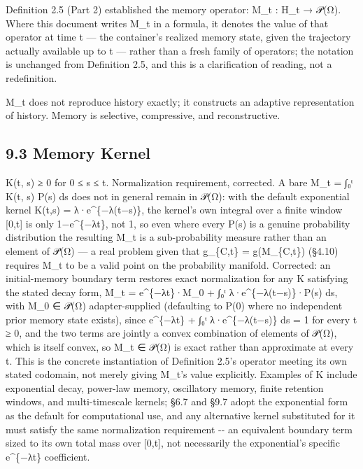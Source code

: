 \documentclass[
]{article}
\begin{document}
Definition 2.5 (Part 2) established the memory operator: M\_t : H\_t →
𝒫(Ω). Where this document writes M\_t in a formula, it denotes the value
of that operator at time t --- the container's realized memory state,
given the trajectory actually available up to t --- rather than a fresh
family of operators; the notation is unchanged from Definition 2.5, and
this is a clarification of reading, not a redefinition.

M\_t does not reproduce history exactly; it constructs an adaptive
representation of history. Memory is selective, compressive, and
reconstructive.

\hypertarget{memory-kernel}{%
\subsection{9.3 Memory Kernel}\label{memory-kernel}}

K(t, s) ≥ 0 for 0 ≤ s ≤ t. Normalization requirement, corrected. A bare
M\_t = ∫₀ᵗ K(t, s) P(s) ds does not in general remain in 𝒫(Ω): with the
default exponential kernel K(t,s) = λ·e\^{}\{−λ(t−s)\}, the kernel's own
integral over a finite window {[}0,t{]} is only 1−e\^{}\{−λt\}, not 1,
so even where every P(s) is a genuine probability distribution the
resulting M\_t is a sub-probability measure rather than an element of
𝒫(Ω) --- a real problem given that g\_\{C,t\} = g(M\_\{C,t\}) (§4.10)
requires M\_t to be a valid point on the probability manifold.
Corrected: an initial-memory boundary term restores exact normalization
for any K satisfying the stated decay form, M\_t = e\^{}\{−λt\}·M\_0 +
∫₀ᵗ λ·e\^{}\{−λ(t−s)\}·P(s) ds, with M\_0 ∈ 𝒫(Ω) adapter-supplied
(defaulting to P(0) where no independent prior memory state exists),
since e\^{}\{−λt\} + ∫₀ᵗ λ·e\^{}\{−λ(t−s)\} ds = 1 for every t ≥ 0, and
the two terms are jointly a convex combination of elements of 𝒫(Ω),
which is itself convex, so M\_t ∈ 𝒫(Ω) is exact rather than approximate
at every t. This is the concrete instantiation of Definition 2.5's
operator meeting its own stated codomain, not merely giving M\_t's value
explicitly. Examples of K include exponential decay, power-law memory,
oscillatory memory, finite retention windows, and multi-timescale
kernels; §6.7 and §9.7 adopt the exponential form as the default for
computational use, and any alternative kernel substituted for it must
satisfy the same normalization requirement -\/- an equivalent boundary
term sized to its own total mass over {[}0,t{]}, not necessarily the
exponential's specific e\^{}\{−λt\} coefficient.
\end{document}

